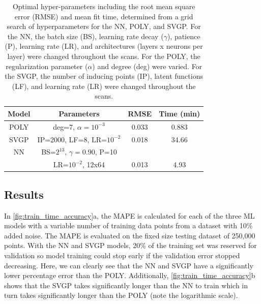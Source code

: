 \begin{table}
	\centering
    \begin{tabular}{|c|c|c|c|}
	\hline
	Model & Parameters & RMSE & Time (min)   \\
	\hline
	POLY & deg=7, $\alpha=10^{-3}$  & 0.033 & 0.883 \\ 
	\hline
	SVGP & IP=2000, LF=8, LR=$10^{-2}$  & 0.018 & 34.66 \\ 
	\hline
	NN  & BS=$2^{13}$, $\gamma=0.90$, P=10 & &\\
	& LR=$10^{-2}$, 12x64  & 0.013 & 4.93 \\ 
	\hline
\end{tabular}
	\caption{Optimal hyper-parameters including the root mean square error (RMSE) and mean fit time, determined from a grid search of hyperparameters for the NN, POLY, and SVGP. For the NN, the batch size (BS), learning rate decay ($\gamma$), patience (P), learning rate (LR), and architectures (layers x neurons per layer) were changed throughout the scans. For the POLY, the regularization parameter ($\alpha$) and degree (deg) were varied. For the SVGP, the number of inducing points (IP), latent functions (LF), and learning rate (LR) were changed throughout the scans.}
	\label{tab:hps2}
\end{table}

\subsection{Results}

In \autoref{fig:train_time_accuracy}a, the \gls{MAPE} is calculated for each of the three \gls{ML} models with a variable number of training data points from a dataset with 10\% added noise. The \gls{MAPE} is evaluated on the fixed size testing dataset of 250,000 points. With the \gls{NN} and \gls{SVGP} models, 20\% of the training set was reserved for validation so model training could stop early if the validation error stopped decreasing. Here, we can clearly see that the \gls{NN} and \gls{SVGP} have a significantly lower percentage error than the \gls{POLY}. Additionally, \autoref{fig:train_time_accuracy}b shows that the \gls{SVGP} takes significantly longer than the \gls{NN} to train which in turn takes significantly longer than the \gls{POLY} (note the logarithmic scale).

